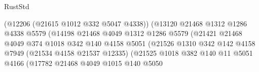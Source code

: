 \begin{lexlean}{RustStd}
\begin{coremodule}
{\begin{coremodule}
{{{{{{{{{{{{{{{{{{{{{{{{{{{{{{{{{{{{{{{{{{{{{{{{{{                                                (@12206 (@21615 @1012 @332 @5047 @4338))
                                                (@13120
                                                  @21468
                                                  @1312
                                                  @1286
                                                  @4338
                                                  @5579
                                                  (@14198
                                                    @21468
                                                    @4049
                                                    @1312
                                                    @1286
                                                    @5579
                                                    (@21421
                                                      @21468
                                                      @4049
                                                      @374
                                                      @1018
                                                      @342
                                                      @140
                                                      @4158
                                                      @5051
                                                      (@21526
                                                        @1310
                                                        @342
                                                        @142
                                                        @4158
                                                        @7949
                                                        (@21534 @4158 @21537 @12335)
                                                        (@21525
                                                          @1018
                                                          @382
                                                          @140
                                                          @11
                                                          @5051
                                                          @4166
                                                          (@17782
                                                            @21468
                                                            @4049
                                                            @1015
                                                            @140
                                                            @5050
}}}}}}}}}}}}}}}}}}}}}}}}}}}}}}}}}}}}}}}}}}}}}}}}}}
\end{coremodule}}
\end{coremodule}
\end{lexlean}

